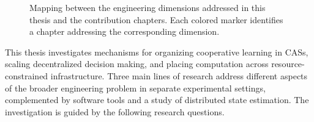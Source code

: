 \begin{figure}
{%
    }

    \endgroup
    \caption{Mapping between the engineering dimensions
        addressed in this thesis and the contribution chapters.
        Each colored marker identifies a chapter
        addressing the corresponding dimension.}
    \label{fig:mapping}
\end{figure}

This thesis investigates mechanisms for organizing cooperative learning in
 \glspl{CAS}, scaling decentralized decision making, and placing computation
 across resource-constrained infrastructure.
%
Three main lines of research address different aspects of the broader engineering
 problem in separate experimental settings, complemented by software tools
 and a study of distributed state estimation.
%
The investigation is guided by the following research questions.


